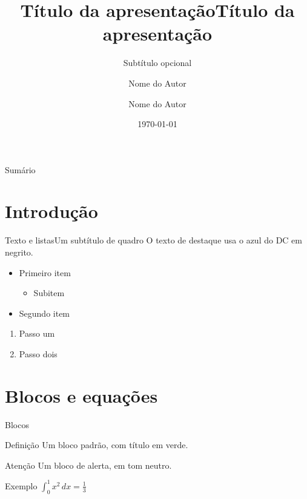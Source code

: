 \documentclass[aspectratio=169,10pt]{beamer}
\title{Título da apresentação}
\subtitle{Subtítulo opcional}
\author{Nome do Autor}
\institute{Departamento de Computação\\Universidade Estadual de Londrina}
\date{\today}
\title[Título curto]{Título da apresentação}
\author[Nome do Autor]{Nome do Autor}
\begin{document}
\maketitle

\begin{frame}{Sumário}
  \tableofcontents
\end{frame}

\section{Introdução}

\begin{frame}{Texto e listas}{Um subtítulo de quadro}
  O \alert{texto de destaque} usa o azul do DC em negrito.
  \begin{itemize}
    \item Primeiro item
    \begin{itemize}
      \item Subitem
    \end{itemize}
    \item Segundo item
  \end{itemize}
  \begin{enumerate}
    \item Passo um
    \item Passo dois
  \end{enumerate}
\end{frame}

\section{Blocos e equações}

\begin{frame}{Blocos}
  \begin{block}{Definição}
    Um bloco padrão, com título em verde.
  \end{block}
  \begin{alertblock}{Atenção}
    Um bloco de alerta, em tom neutro.
  \end{alertblock}
  \begin{exampleblock}{Exemplo}
    $\displaystyle \int_0^1 x^2\,dx = \frac{1}{3}$
  \end{exampleblock}
\end{frame}
\end{document}

